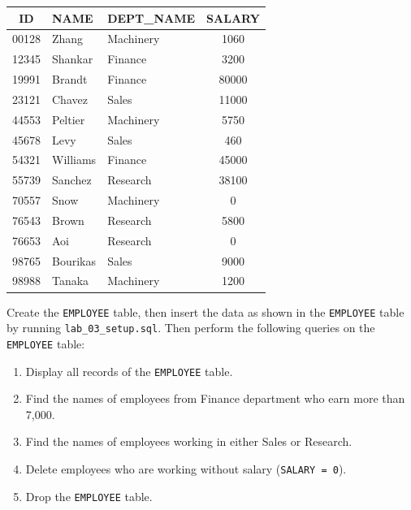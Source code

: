 \documentclass[12pt,a4paper]{article}
\begin{document}
    \begin{table}[h!]\centering
    \begin{tabular}{|c|l|l|c|}
        \hline
        \textbf{ID} & \textbf{NAME} & \textbf{DEPT\_NAME} & \textbf{SALARY} \\ \hline
        00128 & Zhang & Machinery & 1060 \\
        12345 & Shankar & Finance & 3200 \\
        19991 & Brandt & Finance & 80000 \\
        23121 & Chavez & Sales & 11000 \\
        44553 & Peltier & Machinery & 5750 \\
        45678 & Levy & Sales & 460 \\
        54321 & Williams & Finance & 45000 \\
        55739 & Sanchez & Research & 38100 \\ 
        70557 & Snow & Machinery & 0 \\
        76543 & Brown & Research & 5800 \\
        76653 & Aoi & Research & 0 \\
        98765 & Bourikas & Sales & 9000 \\
        98988 & Tanaka & Machinery & 1200 \\ \hline
    \end{tabular}
    \end{table}

\noindent Create the \texttt{EMPLOYEE} table, then insert the data as shown in the \texttt{EMPLOYEE} table by running \texttt{lab\_03\_setup.sql}. Then perform the following queries on the \texttt{EMPLOYEE} table:
\begin{enumerate}
    \item Display all records of the \texttt{EMPLOYEE} table.
    \item Find the names of employees from Finance department who earn more than 7,000.
    \item Find the names of employees working in either Sales or Research.
    \item Delete employees who are working without salary (\texttt{SALARY = 0}).
    \item Drop the \texttt{EMPLOYEE} table.

\end{enumerate}
\end{document}
